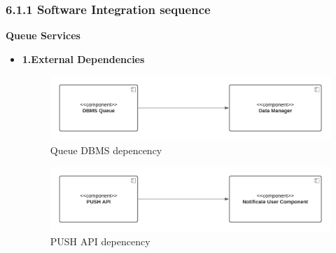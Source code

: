 \subsubsection{6.1.1 Software Integration sequence}
\label{subsect: softwareintegrationsequence}
\textbf{Queue Services}
\begin{itemize}
    \item \textbf{1.External Dependencies}
    \begin{figure}[h!]
        \centering
        \includegraphics[width=.8\textwidth]{Images/TestDiagram/Queue/ExternalDepDBMS.png}
        \caption{\label{fig:QueueExternalDepDBMS}{Queue DBMS depencency}}
    \end{figure}
    \FloatBarrier  
    
    \begin{figure}[h!]
        \centering
        \includegraphics[width=.8\textwidth]{Images/TestDiagram/Queue/ExternalDepPUSH.png}
        \caption{\label{fig:QueueExternalDepPUSH}{PUSH API depencency}}
    \end{figure}
    \FloatBarrier  
    

\end{itemize}
